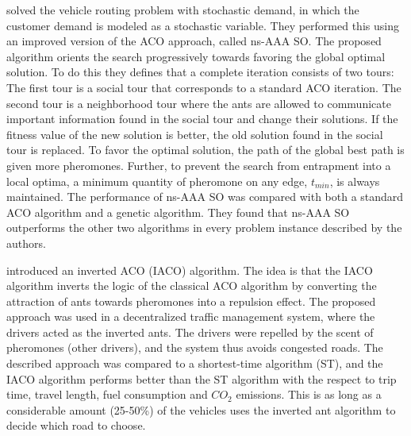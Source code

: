 \citet{tripathi09} solved the vehicle routing problem with stochastic demand, in which the customer demand is modeled as a stochastic variable. They performed this using an improved version of the ACO approach, called ns-AAA SO. The proposed algorithm orients the search progressively towards favoring the global optimal solution. To do this they defines that a complete iteration consists of two tours: The first tour is a social tour that corresponds to a standard ACO iteration. The second tour is a neighborhood tour where the ants are allowed to communicate important information found in the social tour and change their solutions. If the fitness value of the new solution is better, the old solution found in the social tour is replaced. To favor the optimal solution, the path of the global best path is given more pheromones. Further, to prevent the search from entrapment into a local optima, a minimum quantity of pheromone on any edge, $t_{min}$, is always maintained. The performance of ns-AAA SO was compared with both a standard ACO algorithm and a genetic algorithm. They found that ns-AAA SO outperforms the other two algorithms in every problem instance described by the authors.

\citet{dias14} introduced an inverted ACO (IACO) algorithm. The idea is that the IACO algorithm inverts the logic of the classical ACO algorithm by converting the attraction of ants towards pheromones into a repulsion effect. The proposed approach was used in a decentralized traffic management system, where the drivers acted as the inverted ants. The drivers were repelled by the scent of pheromones (other drivers), and the system thus avoids congested roads. The described approach was compared to a shortest-time algorithm (ST), and the IACO algorithm performs better than the ST algorithm with the respect to trip time, travel length, fuel consumption and $CO_2$ emissions. This is as long as a considerable amount (25-50\%) of the vehicles uses the inverted ant algorithm to decide which road to choose. 

